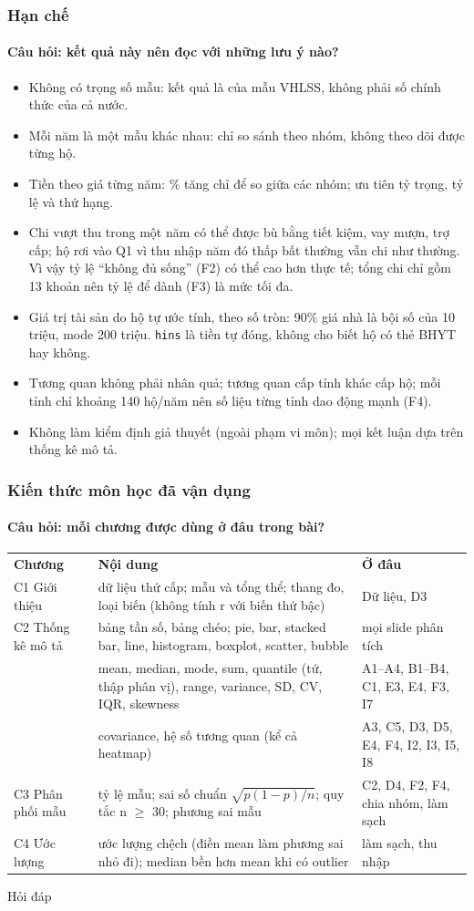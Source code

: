 \documentclass[aspectratio=169,10pt,t]{beamer}
\newcommand{\ask}[1]{{\color{ink2}Câu hỏi: #1}}
\begin{document}
\begin{frame}\frametitle{Hạn chế}
\framesubtitle{\ask{kết quả này nên đọc với những lưu ý nào?}}
\vspace{2pt}
\begin{itemize}\small
\setlength{\itemsep}{4pt}
\item Không có trọng số mẫu: kết quả là của mẫu VHLSS, không phải số chính thức của cả nước.
\item Mỗi năm là một mẫu khác nhau: chỉ so sánh theo nhóm, không theo dõi được từng hộ.
\item Tiền theo giá từng năm: \% tăng chỉ để so giữa các nhóm; ưu tiên tỷ trọng, tỷ lệ và thứ hạng.
\item Chi vượt thu trong một năm có thể được bù bằng tiết kiệm, vay mượn, trợ cấp; hộ rơi vào Q1 vì thu nhập năm đó thấp bất thường vẫn chi như thường. Vì vậy tỷ lệ “không đủ sống” (F2) có thể cao hơn thực tế; tổng chi chỉ gồm 13 khoản nên tỷ lệ để dành (F3) là mức tối đa.
\item Giá trị tài sản do hộ tự ước tính, theo số tròn: 90\% giá nhà là bội số của 10 triệu, mode 200 triệu. \texttt{hins} là tiền tự đóng, không cho biết hộ có thẻ BHYT hay không.
\item Tương quan không phải nhân quả; tương quan cấp tỉnh khác cấp hộ; mỗi tỉnh chỉ khoảng 140 hộ/năm nên số liệu từng tỉnh dao động mạnh (F4).
\item Không làm kiểm định giả thuyết (ngoài phạm vi môn); mọi kết luận dựa trên thống kê mô tả.
\end{itemize}
\end{frame}

\begin{frame}\frametitle{Kiến thức môn học đã vận dụng}
\framesubtitle{\ask{mỗi chương được dùng ở đâu trong bài?}}
\footnotesize
\begin{tabularx}{\textwidth}{@{}L{3.0cm}X L{4.4cm}@{}}
\textbf{Chương} & \textbf{Nội dung} & \textbf{Ở đâu}\\
C1 Giới thiệu & dữ liệu thứ cấp; mẫu và tổng thể; thang đo, loại biến (không tính r với biến thứ bậc) & Dữ liệu, D3\\
C2 Thống kê mô tả & bảng tần số, bảng chéo; pie, bar, stacked bar, line, histogram, boxplot, scatter, bubble & mọi slide phân tích\\
 & mean, median, mode, sum, quantile (tứ, thập phân vị), range, variance, SD, CV, IQR, skewness & A1–A4, B1–B4, C1, E3, E4, F3, I7\\
 & covariance, hệ số tương quan (kể cả heatmap) & A3, C5, D3, D5, E4, F4, I2, I3, I5, I8\\
C3 Phân phối mẫu & tỷ lệ mẫu; sai số chuẩn $\sqrt{p(1-p)/n}$; quy tắc n $\geq$ 30; phương sai mẫu & C2, D4, F2, F4, chia nhóm, làm sạch\\
C4 Ước lượng & ước lượng chệch (điền mean làm phương sai nhỏ đi); median bền hơn mean khi có outlier & làm sạch, thu nhập\\
\bottomrule
\end{tabularx}
\end{frame}

\begin{frame}[standout,c]
\par\vspace{10pt}
{\normalsize\normalfont Hỏi đáp}
\end{frame}
\end{document}
